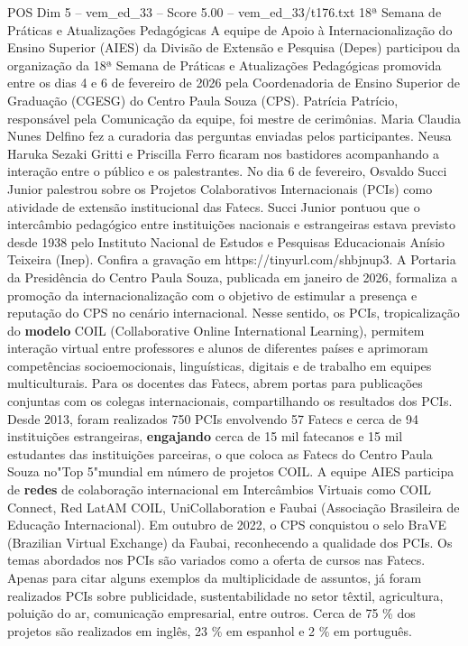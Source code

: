 \begin{textsample}{POS Dim 5 – vem\_ed\_33 – Score 5.00 – vem\_ed\_33/t176.txt}  \label{ex:f5_pos_098}
18ª Semana de Práticas e Atualizações Pedagógicas A equipe de Apoio à Internacionalização do Ensino Superior (AIES) da Divisão de Extensão e Pesquisa (Depes) participou da organização da 18ª Semana de Práticas e Atualizações Pedagógicas promovida entre os dias 4 e 6 de fevereiro de 2026 pela Coordenadoria de Ensino Superior de Graduação (CGESG) do Centro Paula Souza (CPS).
Patrícia Patrício, responsável pela Comunicação da equipe, foi mestre de cerimônias.
Maria Claudia Nunes Delfino fez a curadoria das perguntas enviadas pelos participantes.
Neusa Haruka Sezaki Gritti e Priscilla Ferro ficaram nos bastidores acompanhando a interação entre o público e os palestrantes.
No dia 6 de fevereiro, Osvaldo Succi Junior palestrou sobre os Projetos Colaborativos Internacionais (PCIs) como atividade de extensão institucional das Fatecs.
Succi Junior pontuou que o intercâmbio pedagógico entre instituições nacionais e estrangeiras estava previsto desde 1938 pelo Instituto Nacional de Estudos e Pesquisas Educacionais Anísio Teixeira (Inep).
Confira a gravação em https://tinyurl.com/shbjnup3.
A Portaria da Presidência do Centro Paula Souza, publicada em janeiro de 2026, formaliza a promoção da internacionalização com o objetivo de estimular a presença e reputação do CPS no cenário internacional.
Nesse sentido, os PCIs, tropicalização do \textbf{modelo} COIL (Collaborative Online International Learning), permitem interação virtual entre professores e alunos de diferentes países e aprimoram competências socioemocionais, linguísticas, digitais e de trabalho em equipes multiculturais.
Para os docentes das Fatecs, abrem portas para publicações conjuntas com os colegas internacionais, compartilhando os resultados dos PCIs.
Desde 2013, foram realizados 750 PCIs envolvendo 57 Fatecs e cerca de 94 instituições estrangeiras, \textbf{engajando} cerca de 15 mil fatecanos e 15 mil estudantes das instituições parceiras, o que coloca as Fatecs do Centro Paula Souza no"Top 5"mundial em número de projetos COIL.
A equipe AIES participa de \textbf{redes} de colaboração internacional em Intercâmbios Virtuais como COIL Connect, Red LatAM COIL, UniCollaboration e Faubai (Associação Brasileira de Educação Internacional).
Em outubro de 2022, o CPS conquistou o selo BraVE (Brazilian Virtual Exchange) da Faubai, reconhecendo a qualidade dos PCIs.
Os temas abordados nos PCIs são variados como a oferta de cursos nas Fatecs.
Apenas para citar alguns exemplos da multiplicidade de assuntos, já foram realizados PCIs sobre publicidade, sustentabilidade no setor têxtil, agricultura, poluição do ar, comunicação empresarial, entre outros.
Cerca de 75 \% dos projetos são realizados em inglês, 23 \% em espanhol e 2 \% em português.

\end{textsample}
